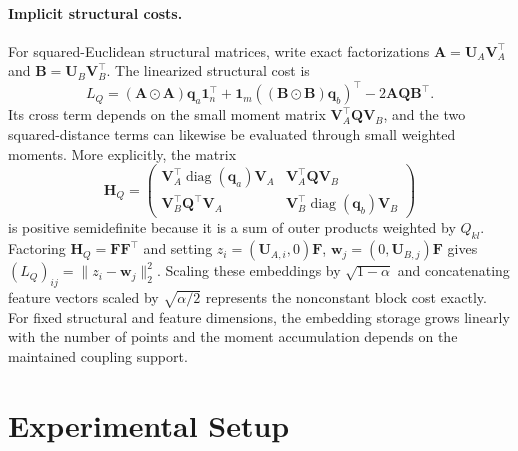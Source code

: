 \paragraph{Implicit structural costs.}
For squared-Euclidean structural matrices, write exact factorizations $\mathbf{A}=\mathbf{U}_A\mathbf{V}_A^\top$ and $\mathbf{B}=\mathbf{U}_B\mathbf{V}_B^\top$.
The linearized structural cost is
\begin{equation*}
L_Q=(\mathbf{A}\odot \mathbf{A})\mathbf{q}_a\mathbf{1}_n^\top+\mathbf{1}_m((\mathbf{B}\odot \mathbf{B})\mathbf{q}_b)^\top-2\mathbf{A}\mathbf{Q}\mathbf{B}^\top.
\end{equation*}
Its cross term depends on the small moment matrix $\mathbf{V}_A^\top \mathbf{Q}\mathbf{V}_B$, and the two squared-distance terms can likewise be evaluated through small weighted moments.
More explicitly, the matrix
\begin{equation*}
\mathbf{H}_Q=\begin{pmatrix}
\mathbf{V}_A^\top\operatorname{diag}(\mathbf{q}_a)\mathbf{V}_A&\mathbf{V}_A^\top \mathbf{Q}\mathbf{V}_B\\
\mathbf{V}_B^\top \mathbf{Q}^\top \mathbf{V}_A&\mathbf{V}_B^\top\operatorname{diag}(\mathbf{q}_b)\mathbf{V}_B
\end{pmatrix}
\end{equation*}
is positive semidefinite because it is a sum of outer products weighted by $Q_{kl}$.
Factoring $\mathbf{H}_Q=\mathbf{F}\mathbf{F}^\top$ and setting $z_i=(\mathbf{U}_{A,i},0)\mathbf{F}$, $\mathbf{w}_j=(0,\mathbf{U}_{B,j})\mathbf{F}$ gives $(L_Q)_{ij}=\|z_i-\mathbf{w}_j\|_2^2$.
Scaling these embeddings by $\sqrt{1-\alpha}$ and concatenating feature vectors scaled by $\sqrt{\alpha/2}$ represents the nonconstant block cost exactly.
For fixed structural and feature dimensions, the embedding storage grows linearly with the number of points and the moment accumulation depends on the maintained coupling support.

\section{Experimental Setup}

